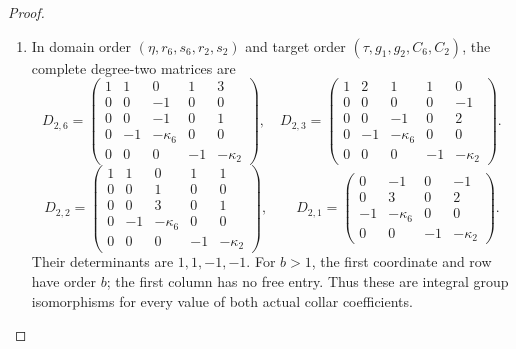 \begin{proof}
\begin{enumerate}[label=\arabic*.]
\item In domain order $(\eta,r_6,s_6,r_2,s_2)$ and target order
$(\tau,g_1,g_2,C_6,C_2)$, the complete degree-two matrices are
\[
 D_{2,6}=\begin{pmatrix}
1&1&0&1&3\\0&0&-1&0&0\\0&0&-1&0&1\\
0&-1&-\kappa_6&0&0\\0&0&0&-1&-\kappa_2
\end{pmatrix},\quad
 D_{2,3}=\begin{pmatrix}
1&2&1&1&0\\0&0&0&0&-1\\0&0&-1&0&2\\
0&-1&-\kappa_6&0&0\\0&0&0&-1&-\kappa_2
\end{pmatrix}.                                                  \tag{F46.16}
\]
\[
 D_{2,2}=\begin{pmatrix}
1&1&0&1&1\\0&0&1&0&0\\0&0&3&0&1\\
0&-1&-\kappa_6&0&0\\0&0&0&-1&-\kappa_2
\end{pmatrix},\qquad
 D_{2,1}=\begin{pmatrix}
0&-1&0&-1\\0&3&0&2\\-1&-\kappa_6&0&0\\
0&0&-1&-\kappa_2
\end{pmatrix}.                                                  \tag{F46.17}
\]
Their determinants are $1,1,-1,-1$. For $b>1$, the first
coordinate and row have order $b$; the first column has no
free entry. Thus these are integral group isomorphisms for
every value of both actual collar coefficients.


\end{enumerate}
\end{proof}
